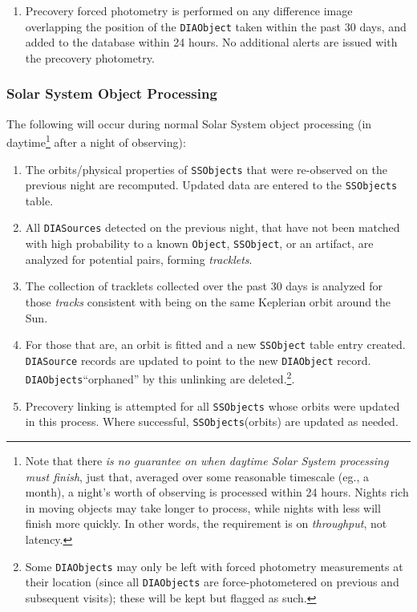 \documentclass[12pt]{article}
\newcommand{\code}[1]{\texttt{#1}}
\newcommand{\DIASource}{\code{DIASource}\xspace}
\newcommand{\DIASources}{\code{DIASources}\xspace}
\newcommand{\DIAObject}{\code{DIAObject}\xspace}
\newcommand{\DIAObjects}{\code{DIAObjects}\xspace}
\newcommand{\Object}{\code{Object}\xspace}
\newcommand{\SSObject}{\code{SSObject}\xspace}
\newcommand{\SSObjects}{\code{SSObjects}\xspace}
\begin{document}
\begin{enumerate}
\item Precovery forced photometry is performed on any difference image overlapping the position of the \DIAObject taken within the past 30 days, and added to the database within 24 hours. No additional alerts are issued with the precovery photometry.
\end{enumerate}

\subsubsection{Solar System Object Processing}
\label{sec:ssProcessing}

The following will occur during normal Solar System object processing (in daytime\footnote{Note that there {\em is no guarantee on when daytime Solar System processing must finish}, just that, averaged over some reasonable timescale (eg., a month), a night's worth of observing is processed within 24 hours. Nights rich in moving objects may take longer to process, while nights with less will finish more quickly. In other words, the requirement is on {\em throughput}, not latency.} after a night of observing):
\begin{enumerate}
\item The orbits/physical properties of \SSObjects that were re-observed on the previous night are recomputed. Updated data are entered to the \SSObjects table.
\item All \DIASources detected on the previous night, that have not been matched with high probability to a known \Object, \SSObject, or an artifact, are analyzed for potential pairs, forming {\em tracklets}.
\item The collection of tracklets collected over the past 30 days is analyzed for those {\em tracks} consistent with being on the same Keplerian orbit around the Sun.
\item For those that are, an orbit is fitted and a new \SSObject table entry created. \DIASource records are updated to point to the new \DIAObject record. \DIAObjects ``orphaned'' by this unlinking are deleted.\footnote{Some \DIAObjects may only be left with forced photometry measurements at their location (since all \DIAObjects are force-photometered on previous and subsequent visits);  these will be kept but flagged as such.}.
\item Precovery linking is attempted for all \SSObjects whose orbits were updated in this process. Where successful, \SSObjects (orbits) are updated as needed.
\end{enumerate}
\end{document}
